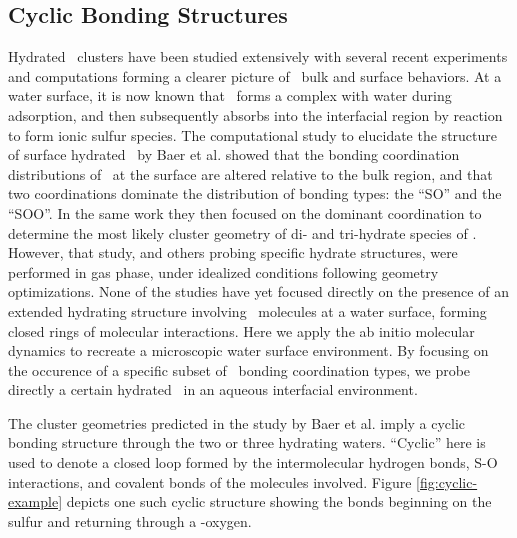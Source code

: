 \subsection {Cyclic Bonding Structures}

Hydrated \suldiox~clusters have been studied extensively with several recent experiments and computations forming a clearer picture of \suldiox~bulk and surface behaviors.\cite{Baer2010, Tarbuck2005, Tarbuck2006, Ota2011, Bishenden1998, Hirabayashi2006, Steudel2009, Yang2002, Hayashi1985, Moin2011, Eckl2008, Jayne1990, Jayne1990a, Donaldson1995} At a water surface, it is now known that \suldiox~forms a complex with water during adsorption, and then subsequently absorbs into the interfacial region by reaction to form ionic sulfur species.\cite{Tarbuck2005, Tarbuck2006, Ota2011} The computational study to elucidate the structure of surface hydrated \suldiox~by Baer et al. showed that the bonding coordination distributions of \suldiox~at the surface are altered relative to the bulk region, and that two coordinations dominate the distribution of bonding types: the ``SO'' and the ``SOO''. In the same work they then focused on the dominant coordination to determine the most likely cluster geometry of di- and tri-hydrate species of \suldiox. However, that study, and others probing specific hydrate structures, were performed in gas phase, under idealized conditions following geometry optimizations. None of the studies have yet focused directly on the presence of an extended hydrating structure involving \suldiox~molecules at a water surface, forming closed rings of molecular interactions. Here we apply the ab initio molecular dynamics to recreate a microscopic water surface environment. By focusing on the occurence of a specific subset of \suldiox~bonding coordination types, we probe directly a certain hydrated \suldiox~in an aqueous interfacial environment.

The cluster geometries predicted in the study by Baer et al. imply a cyclic bonding structure through the two or three hydrating waters. ``Cyclic'' here is used to denote a closed loop formed by the intermolecular hydrogen bonds, S-O interactions, and covalent bonds of the molecules involved. Figure \ref{fig:cyclic-example} depicts one such cyclic structure showing the bonds beginning on the sulfur and returning through a \suldiox-oxygen.

